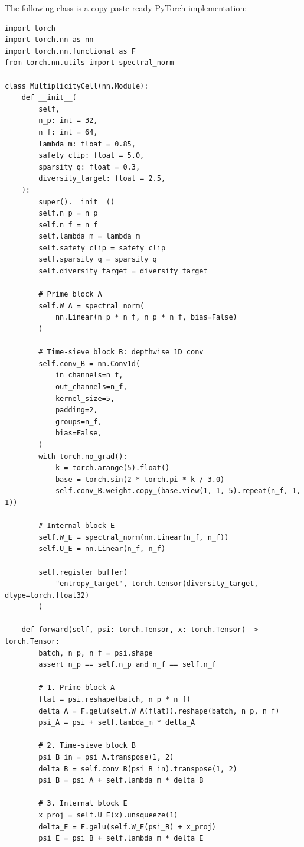 \documentclass[11pt]{article}
\theoremstyle{definition}
\theoremstyle{plain}
\begin{document}
\noindent The following class is a copy-paste-ready PyTorch implementation:

\begin{verbatim}
import torch
import torch.nn as nn
import torch.nn.functional as F
from torch.nn.utils import spectral_norm

class MultiplicityCell(nn.Module):
    def __init__(
        self,
        n_p: int = 32,
        n_f: int = 64,
        lambda_m: float = 0.85,
        safety_clip: float = 5.0,
        sparsity_q: float = 0.3,
        diversity_target: float = 2.5,
    ):
        super().__init__()
        self.n_p = n_p
        self.n_f = n_f
        self.lambda_m = lambda_m
        self.safety_clip = safety_clip
        self.sparsity_q = sparsity_q
        self.diversity_target = diversity_target

        # Prime block A
        self.W_A = spectral_norm(
            nn.Linear(n_p * n_f, n_p * n_f, bias=False)
        )

        # Time-sieve block B: depthwise 1D conv
        self.conv_B = nn.Conv1d(
            in_channels=n_f,
            out_channels=n_f,
            kernel_size=5,
            padding=2,
            groups=n_f,
            bias=False,
        )
        with torch.no_grad():
            k = torch.arange(5).float()
            base = torch.sin(2 * torch.pi * k / 3.0)
            self.conv_B.weight.copy_(base.view(1, 1, 5).repeat(n_f, 1, 1))

        # Internal block E
        self.W_E = spectral_norm(nn.Linear(n_f, n_f))
        self.U_E = nn.Linear(n_f, n_f)

        self.register_buffer(
            "entropy_target", torch.tensor(diversity_target, dtype=torch.float32)
        )

    def forward(self, psi: torch.Tensor, x: torch.Tensor) -> torch.Tensor:
        batch, n_p, n_f = psi.shape
        assert n_p == self.n_p and n_f == self.n_f

        # 1. Prime block A
        flat = psi.reshape(batch, n_p * n_f)
        delta_A = F.gelu(self.W_A(flat)).reshape(batch, n_p, n_f)
        psi_A = psi + self.lambda_m * delta_A

        # 2. Time-sieve block B
        psi_B_in = psi_A.transpose(1, 2)
        delta_B = self.conv_B(psi_B_in).transpose(1, 2)
        psi_B = psi_A + self.lambda_m * delta_B

        # 3. Internal block E
        x_proj = self.U_E(x).unsqueeze(1)
        delta_E = F.gelu(self.W_E(psi_B) + x_proj)
        psi_E = psi_B + self.lambda_m * delta_E


\end{verbatim}
\end{document}
